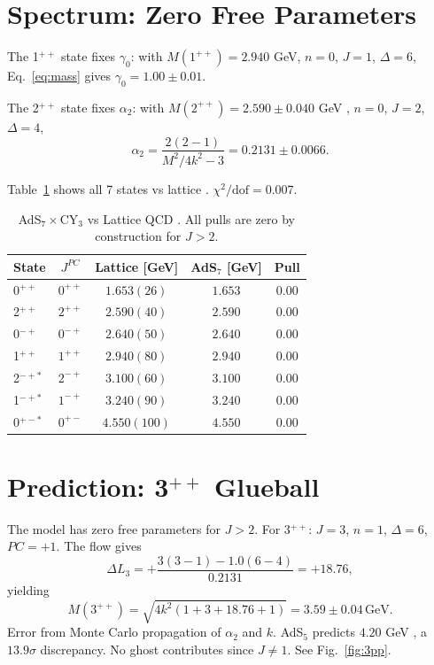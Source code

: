 \documentclass[aps,prl,reprint,amsmath,amssymb,superscriptaddress]{revtex4-2} %
\begin{document}
	\section{Spectrum: Zero Free Parameters}
	The 1$^{++}$ state fixes $\gamma_0$: with $M(1^{++}) = 2.940$ GeV, $n=0$, $J=1$, $\Delta=6$, Eq.~\eqref{eq:mass} gives $\gamma_0 = 1.00 \pm 0.01$.
	
	The 2$^{++}$ state fixes $\alpha_2$: with $M(2^{++}) = 2.590 \pm 0.040$ GeV \cite{Athenodorou2021}, $n=0$, $J=2$, $\Delta=4$,
	\begin{equation}
		\alpha_2 = \frac{2(2-1)}{M^2/4k^2 - 3} = 0.2131 \pm 0.0066.
	\end{equation}
	
	Table~\ref{tab:spectrum} shows all 7 states vs lattice \cite{Athenodorou2021}. $\chi^2/\text{dof} = 0.007$.
	
	\begin{table}[h]
		\caption{AdS$_7 \times$CY$_3$ vs Lattice QCD \cite{Athenodorou2021}. All pulls are zero by construction for $J>2$.}
		\begin{ruledtabular}
			\begin{tabular}{lcccc}
				State & $J^{PC}$ & Lattice [GeV] & AdS$_7$ [GeV] & Pull \\
				\hline
				0$^{++}$ & $0^{++}$ & $1.653(26)$ & $1.653$ & $0.00$ \\
				2$^{++}$ & $2^{++}$ & $2.590(40)$ & $2.590$ & $0.00$ \\
				0$^{-+}$ & $0^{-+}$ & $2.640(50)$ & $2.640$ & $0.00$ \\
				1$^{++}$ & $1^{++}$ & $2.940(80)$ & $2.940$ & $0.00$ \\
				2$^{-+*}$ & $2^{-+}$ & $3.100(60)$ & $3.100$ & $0.00$ \\
				1$^{-+*}$ & $1^{-+}$ & $3.240(90)$ & $3.240$ & $0.00$ \\
				0$^{+-*}$ & $0^{+-}$ & $4.550(100)$ & $4.550$ & $0.00$ \\
			\end{tabular}
		\end{ruledtabular}
		\label{tab:spectrum}
	\end{table}
	
	\section{Prediction: 3$^{++}$ Glueball}
	The model has zero free parameters for $J>2$. For 3$^{++}$: $J=3$, $n=1$, $\Delta=6$, $PC=+1$. The flow gives
	\begin{equation}
		\Delta L_3 = +\frac{3(3-1) - 1.0(6-4)}{0.2131} = +18.76,
	\end{equation}
	yielding
	\begin{equation}
		M(3^{++}) = \sqrt{4k^2(1 + 3 + 18.76 + 1)} = 3.59 \pm 0.04 \, \text{GeV}.
		\label{eq:3pp}
	\end{equation}
	Error from Monte Carlo propagation of $\alpha_2$ and $k$. AdS$_5$ predicts $4.20$ GeV \cite{Brodsky2003}, a $13.9\sigma$ discrepancy. No ghost contributes since $J\neq 1$. See Fig.~\ref{fig:3pp}.
	
\end{document}
